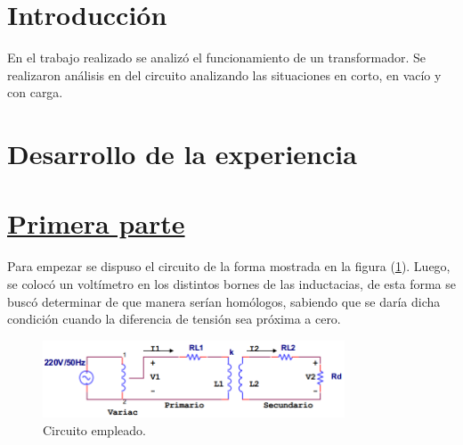 \documentclass[a4paper]{article}
\begin{document}




\section*{Introducción}

En el trabajo realizado se analizó el funcionamiento de un transformador. Se realizaron análisis en del circuito analizando las situaciones en corto, en vacío y con carga. 

\section*{Desarrollo de la experiencia}

\section[I]{\underline{Primera parte}}

Para empezar se dispuso el circuito de la forma mostrada en la figura (\ref{fig:1a}). Luego, se colocó un voltímetro en los distintos bornes de las inductacias, de esta forma se buscó determinar de que manera serían homólogos, sabiendo que se daría dicha condición cuando la diferencia de tensión sea próxima a cero.

\begin{figure}[H]
	\centering
	\includegraphics[width=0.8\textwidth]{Circuito-1.PNG}
	\caption{Circuito empleado.}
	\label{fig:1a}
\end{figure}
\end{document}
